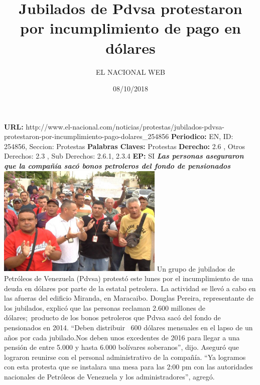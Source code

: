 \documentclass{article}%
\title{\textbf{Jubilados de Pdvsa protestaron por incumplimiento de pago en dólares}}%
\author{EL NACIONAL WEB}%
\date{08/10/2018}%
\begin{document}
%
\normalsize%
\maketitle%
\textbf{URL: }%
http://www.el{-}nacional.com/noticias/protestas/jubilados{-}pdvsa{-}protestaron{-}por{-}incumplimiento{-}pago{-}dolares\_254856\newline%
%
\textbf{Periodico: }%
EN, %
ID: %
254856, %
Seccion: %
Protestas\newline%
%
\textbf{Palabras Claves: }%
Protestas\newline%
%
\textbf{Derecho: }%
2.6%
, Otros Derechos: %
2.3%
, Sub Derechos: %
2.6.1, 2.3.4%
\newline%
%
\textbf{EP: }%
SI\newline%
\newline%
%
\textbf{\textit{Las personas aseguraron que la compañía sacó bonos petroleros del fondo de pensionados~}}%
\newline%
\newline%
%
\includegraphics[width=300px]{247.jpg}%
\newline%
%
Un grupo de jubilados de Petróleos de Venezuela (Pdvsa) protestó este lunes por el incumplimiento de una deuda en dólares por parte de la estatal petrolera.%
\newline%
%
La actividad se llevó a cabo en las afueras del edificio Miranda, en Maracaibo.%
\newline%
%
Douglas Pereira, representante de los jubilados, explicó que las personas reclaman 2.600 millones de dólares;~producto de los bonos petroleros que Pdvsa sacó del fondo de pensionados en 2014.%
\newline%
%
“Deben distribuir~ 600 dólares mensuales en el lapso de un años por cada jubilado.Nos deben unos excedentes de 2016 para llegar a una pensión de entre 5.000 y hasta 6.000 bolívares soberanos”, dijo.%
\newline%
%
Aseguró que lograron reunirse con el personal administrativo de la compañía. “Ya logramos con esta protesta que se instalara una mesa para las 2:00 pm con las autoridades nacionales de Petróleos de Venezuela y los administradores”, agregó.%
\newline%
%
\end{document}
